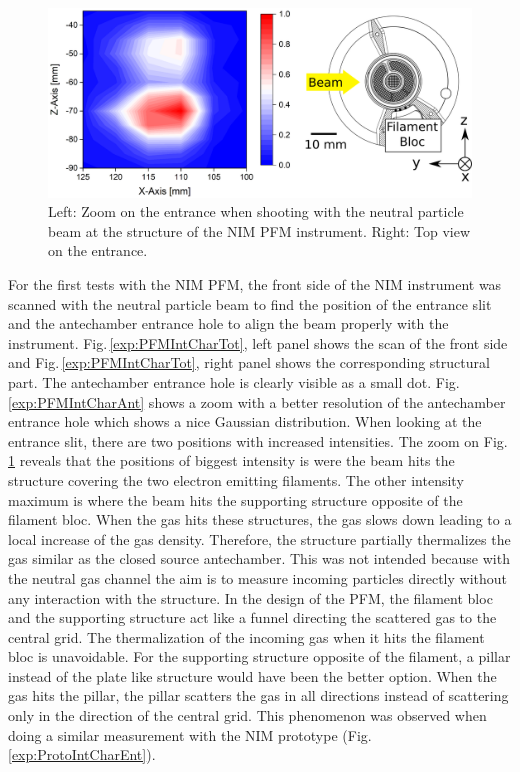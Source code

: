 	\begin{figure}[h!]
		\centering
		\includegraphics[width=\textwidth]{Experiments/2D_scan_Entr.png}
		\caption{Left: Zoom on the entrance when shooting with the neutral particle beam at the structure of the NIM PFM instrument. Right: Top view on the entrance.}
		\label{exp:PFMIntCharEnt}
	\end{figure}
	For the first tests with the NIM PFM, the front side of the NIM instrument was scanned with the neutral particle beam to find the position of the entrance slit and the antechamber entrance hole to align the beam properly with the instrument. Fig.\,\ref{exp:PFMIntCharTot}, left panel shows the scan of the front side and Fig.\,\ref{exp:PFMIntCharTot}, right panel shows the corresponding structural part. The antechamber entrance hole is clearly visible as a small dot. Fig.\,\ref{exp:PFMIntCharAnt} shows a zoom with a better resolution of the antechamber entrance hole which shows a nice Gaussian distribution. When looking at the entrance slit, there are two positions with increased intensities. The zoom on Fig.\,\ref{exp:PFMIntCharEnt} reveals that the positions of biggest intensity is were the beam hits the structure covering the two electron emitting filaments. The other intensity maximum is where the beam hits the supporting structure opposite of the filament bloc. When the gas hits these structures, the gas slows down leading to a local increase of the gas density. Therefore, the structure partially thermalizes the gas similar as the closed source antechamber. This was not intended because with the neutral gas channel the aim is to measure incoming particles directly without any interaction with the structure. In the design of the PFM, the filament bloc and the supporting structure act like a funnel directing the scattered gas to the central grid. The thermalization of the incoming gas when it hits the filament bloc is unavoidable. For the supporting structure opposite of the filament, a pillar instead of the plate like structure would have been the better option. When the gas hits the pillar, the pillar scatters the gas in all directions instead of scattering only in the direction of the central grid. This phenomenon was observed when doing a similar measurement with the NIM prototype (Fig.\,\ref{exp:ProtoIntCharEnt}).\\
